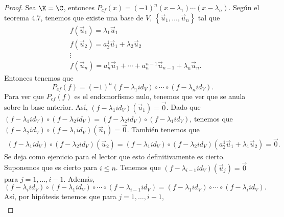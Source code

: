 \begin{proof}
	Sea $\displaystyle  \K = \C $, entonces $\displaystyle P_{cf}\left(x\right) = \left(-1\right)^{n}\left(x - \lambda_{1}\right) \cdots \left(x - \lambda_{n}\right) $. Según el teorema 4.7, tenemos que existe una base de $\displaystyle V $, $\displaystyle \left\{ \vec{u}_{1}, \ldots, \vec{u}_{n}\right\}  $ tal que 
	\[
	\begin{split}
	& f\left(\vec{u}_{1}\right) = \lambda_{1}\vec{u}_{1} \\
	& f\left(\vec{u}_{2}\right) = a^{1}_{2}\vec{u}_{1} + \lambda_{2}\vec{u}_{2} \\
	& \vdots \\
	& f\left(\vec{u}_{n}\right) = a^{1}_{n}\vec{u}_{1} + \cdots + a^{n-1}_{n}\vec{u}_{n-1}+\lambda_{n}\vec{u}_{n}.
	\end{split}
	\]
Entonces tenemos que 
\[P_{cf}\left(f\right) = \left(-1\right)^{n}\left(f-\lambda_{1}id _{V}\right) \circ \cdots \circ \left(f - \lambda_{n}id _{V}\right). \] 
Para ver que $\displaystyle P_{cf}\left(f\right) $ es el endomorfismo nulo, tenemos que ver que se anula sobre la base anterior. Así, $\displaystyle \left(f - \lambda_{1}id _{V}\right)\left(\vec{u}_{1}\right) = \vec{0} $. Dado que $\displaystyle \left(f - \lambda_{1}id _{V}\right) \circ \left(f - \lambda_{2}id _{V}\right) = \left(f - \lambda_{2}id _{V}\right) \circ \left(f - \lambda_{1}id _{V}\right) $, tenemos que $\displaystyle \left(f - \lambda_{2}id _{V}\right) \circ \left(f - \lambda_{1}id _{V}\right)\left(\vec{u}_{1}\right) = \vec{0} $.
También tenemos que  
\[
\begin{split}
	\left(f - \lambda_{1}id _{V}\right) \circ \left(f - \lambda_{2}id _{V}\right)\left(\vec{u}_{2}\right) = \left(f - \lambda_{1}id _{V}\right) \circ \left(f - \lambda_{2}id _{V}\right)\left(a^{1}_{2}\vec{u}_{1}+\lambda_{1}\vec{u}_{2}\right) = \vec{0} .
\end{split}
\]
Se deja como ejercicio para el lector que esto definitivamente es cierto.
Suponemos que es cierto para $\displaystyle i \leq n $. Tenemos que $\displaystyle \left(f - \lambda_{i - 1}id _{V}\right)\left(\vec{u}_{j}\right) = \vec{0} $ para $\displaystyle j = 1, \ldots, i - 1 $. Además, 
\[ \left(f - \lambda_{i}id _{V}\right)\circ \left(f - \lambda_{1}id _{V}\right) \circ \cdots \circ \left(f - \lambda_{i - 1}id _{V}\right)= \left(f - \lambda_{1}id _{V}\right)\circ \cdots\circ \left(f - \lambda_{i}id _{V}\right).\]
Así, por hipótesis tenemos que para $\displaystyle j = 1, \ldots, i - 1 $,
\[
\begin{split}

\end{split}\]
\end{proof}
